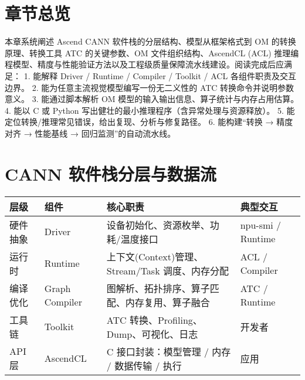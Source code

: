 \section{章节总览}\label{ux7ae0ux8282ux603bux89c8}

本章系统阐述 Ascend CANN 软件栈的分层结构、模型从框架格式到 OM
的转换原理、转换工具 ATC 的关键参数、OM 文件组织结构、AscendCL (ACL)
推理编程模型、精度与性能验证方法以及工程级质量保障流水线建设。阅读完成后应满足：
1. 能解释 Driver / Runtime / Compiler / Toolkit / ACL
各组件职责及交互边界。 2. 能为任意主流视觉模型编写一份无二义性的 ATC
转换命令并说明参数意义。 3. 能通过脚本解析 OM
模型的输入输出信息、算子统计与内存占用估算。 4. 能以 C 或 Python
写出健壮的最小推理程序（含异常处理与资源释放）。 5.
能定位转换/推理常见错误，给出复现、分析与修复路径。 6. 能构建``转换 →
精度对齐 → 性能基线 → 回归监测''的自动流水线。

\section{CANN
软件栈分层与数据流}\label{cann-ux8f6fux4ef6ux6808ux5206ux5c42ux4e0eux6570ux636eux6d41}

\begin{longtable}[]{@{}
  >{\raggedright\arraybackslash}p{}
  >{\raggedright\arraybackslash}p{}
  >{\raggedright\arraybackslash}p{}
  >{\raggedright\arraybackslash}p{}@{}}
\toprule\noalign{}
\begin{minipage}[b]{\linewidth}\raggedright
层级
\end{minipage} & \begin{minipage}[b]{\linewidth}\raggedright
组件
\end{minipage} & \begin{minipage}[b]{\linewidth}\raggedright
核心职责
\end{minipage} & \begin{minipage}[b]{\linewidth}\raggedright
典型交互
\end{minipage} \\
\midrule\noalign{}
\endhead
\bottomrule\noalign{}
\endlastfoot
硬件抽象 & Driver & 设备初始化、资源枚举、功耗/温度接口 & npu-smi /
Runtime \\
运行时 & Runtime & 上下文(Context)管理、Stream/Task 调度、内存分配 & ACL
/ Compiler \\
编译优化 & Graph Compiler &
图解析、拓扑排序、算子匹配、内存复用、算子融合 & ATC / Runtime \\
工具链 & Toolkit & ATC 转换、Profiling、Dump、可视化、日志 & 开发者 \\
API 层 & AscendCL & C 接口封装：模型管理 / 内存 / 数据传输 / 执行 &
应用 \\
\end{longtable}

